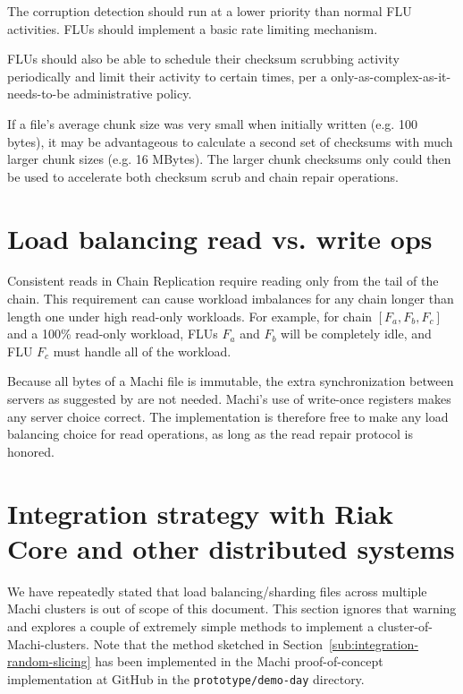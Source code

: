 \documentclass[preprint,10pt]{sigplanconf}
\begin{document}
The corruption detection should run at a lower priority than normal
FLU activities.  FLUs should implement a basic rate limiting
mechanism.

FLUs should also be able to schedule their checksum scrubbing activity
periodically and limit their activity to certain times, per a
only-as-complex-as-it-needs-to-be administrative policy.

If a file's average chunk size was very small when initially written
(e.g. 100 bytes), it may be advantageous to calculate a second set of
checksums with much larger chunk sizes (e.g. 16 MBytes).  The larger
chunk checksums only could then be used to accelerate both checksum
scrub and chain repair operations.

\section{Load balancing read vs. write ops}
\label{sec:load-balancing}

Consistent reads in Chain Replication require reading only from the
tail of the chain.  This requirement can cause workload imbalances for
any chain longer than length one under high read-only workloads.  For
example, for chain $[F_a, F_b, F_c]$ and a 100\% read-only workload,
FLUs $F_a$ and $F_b$ will be completely idle, and FLU $F_c$ must
handle all of the workload.

Because all bytes of a Machi file is immutable, the extra
synchronization between servers as suggested by \cite{cr-craq} are not
needed.
Machi's use of write-once registers makes any server choice correct.
The implementation is
therefore free to make any load balancing choice for read operations,
as long as the read repair protocol is honored.

\section{Integration strategy with Riak Core and other distributed systems}
\label{sec:integration}

We have repeatedly stated that load balancing/sharding files across
multiple Machi clusters is out of scope of this document.  This
section ignores that warning and explores a couple of extremely simple
methods to implement a cluster-of-Machi-clusters.  Note that the
method sketched in Section~\ref{sub:integration-random-slicing} has
been implemented in the Machi proof-of-concept implementation at
GitHub in the {\tt prototype/demo-day} directory.
\end{document}
